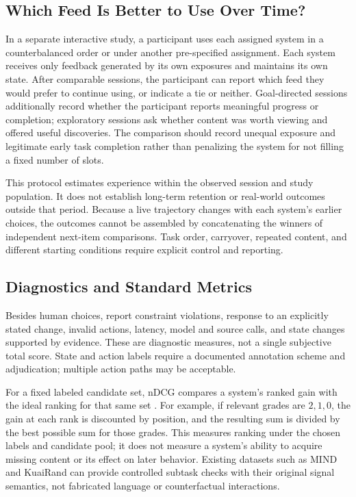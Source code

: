 \documentclass[11pt]{article}
\begin{document}
\subsection{Which Feed Is Better to Use Over Time?}
In a separate interactive study, a participant uses each assigned system in a counterbalanced order or under another pre-specified assignment. Each system receives only feedback generated by its own exposures and maintains its own state. After comparable sessions, the participant can report which feed they would prefer to continue using, or indicate a tie or neither. Goal-directed sessions additionally record whether the participant reports meaningful progress or completion; exploratory sessions ask whether content was worth viewing and offered useful discoveries. The comparison should record unequal exposure and legitimate early task completion rather than penalizing the system for not filling a fixed number of slots.

This protocol estimates experience within the observed session and study population. It does not establish long-term retention or real-world outcomes outside that period. Because a live trajectory changes with each system's earlier choices, the outcomes cannot be assembled by concatenating the winners of independent next-item comparisons. Task order, carryover, repeated content, and different starting conditions require explicit control and reporting.

\subsection{Diagnostics and Standard Metrics}
Besides human choices, report constraint violations, response to an explicitly stated change, invalid actions, latency, model and source calls, and state changes supported by evidence. These are diagnostic measures, not a single subjective total score. State and action labels require a documented annotation scheme and adjudication; multiple action paths may be acceptable.

For a fixed labeled candidate set, nDCG compares a system's ranked gain with the ideal ranking for that same set \citep{jarvelin2002cumulated}. For example, if relevant grades are $2,1,0$, the gain at each rank is discounted by position, and the resulting sum is divided by the best possible sum for those grades. This measures ranking under the chosen labels and candidate pool; it does not measure a system's ability to acquire missing content or its effect on later behavior. Existing datasets such as MIND and KuaiRand can provide controlled subtask checks with their original signal semantics, not fabricated language or counterfactual interactions.
\end{document}
